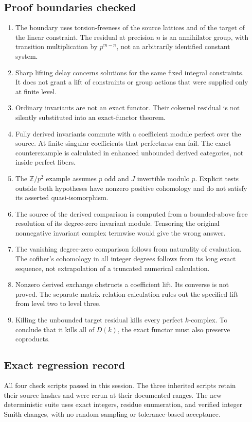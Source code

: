 \documentclass[11pt]{article}
\theoremstyle{definition}
\theoremstyle{remark}
\begin{document}
\subsection{Proof boundaries checked}
\begin{enumerate}
\item The boundary uses torsion-freeness of the source lattices and of the target of the linear constraint. The residual at precision $n$ is an annihilator group, with transition multiplication by $p^{m-n}$, not an arbitrarily identified constant system.
\item Sharp lifting delay concerns solutions for the same fixed integral constraints. It does not grant a lift of constraints or group actions that were supplied only at finite level.
\item Ordinary invariants are not an exact functor. Their cokernel residual is not silently substituted into an exact-functor theorem.
\item Fully derived invariants commute with a coefficient module perfect over the source. At finite singular coefficients that perfectness can fail. The exact counterexample is calculated in enhanced unbounded derived categories, not inside perfect fibers.
\item The $\mathbb Z/p^2$ example assumes $p$ odd and $J$ invertible modulo $p$. Explicit tests outside both hypotheses have nonzero positive cohomology and do not satisfy its asserted quasi-isomorphism.
\item The source of the derived comparison is computed from a bounded-above free resolution of its degree-zero invariant module. Tensoring the original nonnegative invariant complex termwise would give the wrong answer.
\item The vanishing degree-zero comparison follows from naturality of evaluation. The cofiber's cohomology in all integer degrees follows from its long exact sequence, not extrapolation of a truncated numerical calculation.
\item Nonzero derived exchange obstructs a coefficient lift. Its converse is not proved. The separate matrix relation calculation rules out the specified lift from level two to level three.
\item Killing the unbounded target residual kills every perfect $k$-complex. To conclude that it kills all of $D(k)$, the exact functor must also preserve coproducts.
\end{enumerate}

\subsection{Exact regression record}
All four check scripts passed in this session. The three inherited scripts retain their source hashes and were rerun at their documented ranges. The new deterministic suite uses exact integers, residue enumeration, and verified integer Smith changes, with no random sampling or tolerance-based acceptance.
\end{document}
